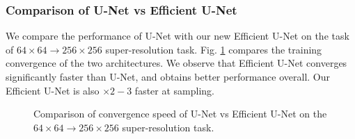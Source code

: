 \subsubsection{Comparison of U-Net vs Efficient U-Net}
\label{sec:unet_vs_efficientunet}
We compare the performance of U-Net with our new Efficient U-Net on the task of $64\times64 \rightarrow 256\times256$ super-resolution task. Fig. \ref{fig:unet_vs_Efficient} compares the training convergence of the two architectures. We observe that Efficient U-Net converges significantly faster than U-Net, and obtains better performance overall. Our Efficient U-Net is also $\times2-3$ faster at sampling.

\begin{figure}
\centering

\caption{Comparison of convergence speed of U-Net vs Efficient U-Net on the $64\times64 \rightarrow 256\times256$ super-resolution task.}
\label{fig:unet_vs_Efficient}
\end{figure}

